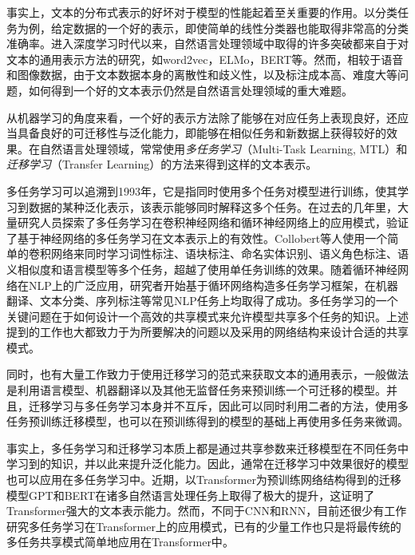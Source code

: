 事实上，文本的分布式表示的好坏对于模型的性能起着至关重要的作用。以分类任务为例，给定数据的一个好的表示，即使简单的线性分类器也能取得非常高的分类准确率\cite{tenney2018you}\cite{liu2019linguistic}。进入深度学习时代以来，自然语言处理领域中取得的许多突破都来自于对文本的通用表示方法的研究，如word2vec\cite{DBLP:conf/nips/MikolovSCCD13}，ELMo\cite{DBLP:conf/naacl/PetersNIGCLZ18}，BERT\cite{devlin2018bert}等。然而，相较于语音和图像数据，由于文本数据本身的离散性和歧义性，以及标注成本高、难度大等问题，如何得到一个好的文本表示仍然是自然语言处理领域的重大难题。

从机器学习的角度来看，一个好的表示方法除了能够在对应任务上表现良好，还应当具备良好的可迁移性与泛化能力，即能够在相似任务和新数据上获得较好的效果。在自然语言处理领域，常常使用\emph{多任务学习}（Multi-Task Learning, MTL）和\emph{迁移学习}（Transfer Learning）的方法来得到这样的文本表示\cite{devlin2018bert}\cite{DBLP:conf/icml/CollobertW08}。

多任务学习可以追溯到1993年\cite{DBLP:conf/icml/Caruana93}，它是指同时使用多个任务对模型进行训练，使其学习到数据的某种泛化表示，该表示能够同时解释这多个任务。在过去的几年里，大量研究人员探索了多任务学习在卷积神经网络和循环神经网络上的应用模式，验证了基于神经网络的多任务学习在文本表示上的有效性。Collobert等人\cite{DBLP:conf/icml/CollobertW08}使用一个简单的卷积网络来同时学习词性标注、语块标注、命名实体识别、语义角色标注、语义相似度和语言模型等多个任务，超越了使用单任务训练的效果。随着循环神经网络在NLP上的广泛应用，研究者开始基于循环网络构造多任务学习框架，在机器翻译\cite{DBLP:conf/acl/DongWHYW15}、文本分类\cite{DBLP:conf/ijcai/LiuQH16}\cite{DBLP:conf/acl/LiuQH17}、序列标注\cite{DBLP:conf/acl/SogaardG16}等常见NLP任务上均取得了成功。多任务学习的一个关键问题在于如何设计一个高效的共享模式来允许模型共享多个任务的知识。上述提到的工作也大都致力于为所要解决的问题以及采用的网络结构来设计合适的共享模式。

同时，也有大量工作致力于使用迁移学习的范式来获取文本的通用表示，一般做法是利用语言模型\cite{DBLP:conf/naacl/PetersNIGCLZ18}\cite{radford2018improving}、机器翻译\cite{DBLP:conf/nips/McCannBXS17}以及其他无监督任务\cite{devlin2018bert}来预训练一个可迁移的模型。并且，迁移学习与多任务学习本身并不互斥，因此可以同时利用二者的方法，使用多任务预训练迁移模型\cite{DBLP:conf/iclr/SubramanianTBP18}，也可以在预训练得到的模型的基础上再使用多任务来微调\cite{liu2019multi}\cite{anonymous2018bam!}。

事实上，多任务学习和迁移学习本质上都是通过共享参数来迁移模型在不同任务中学习到的知识，并以此来提升泛化能力。因此，通常在迁移学习中效果很好的模型也可以应用在多任务学习中。近期，以Transformer为预训练网络结构得到的迁移模型GPT\cite{radford2018improving}和BERT\cite{devlin2018bert}在诸多自然语言处理任务上取得了极大的提升，这证明了Transformer强大的文本表示能力。然而，不同于CNN和RNN，目前还很少有工作研究多任务学习在Transformer上的应用模式，已有的少量工作也只是将最传统的多任务共享模式简单地应用在Transformer中\cite{liu2019multi}。

